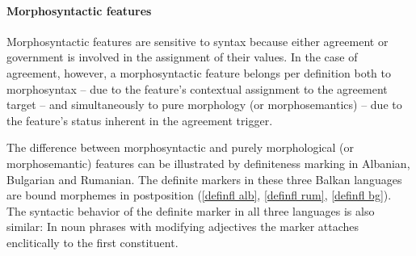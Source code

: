 \paragraph{Morphosyntactic features} 
Morphosyntactic features are sensitive to syntax because either agreement or government is involved in the assignment of their values. In the case of agreement, however, a morphosyntactic feature belongs per definition both to morphosyntax – due to the feature's contextual assignment to the agreement target – and simultaneously to pure morphology (or morphosemantics) – due to the feature's status inherent in the agreement trigger.

The difference between morphosyntactic and purely morphological (or morphosemantic) features can be illustrated by definiteness marking in Albanian, Bulgarian and Rumanian. The definite markers in these three Balkan languages are bound morphemes in postposition (\ref{definfl alb}, \ref{definfl rum}, \ref{definfl bg}). The syntactic behavior of the definite marker in all three languages is also similar: In noun phrases with modifying adjectives the marker attaches enclitically to the first constituent. 
